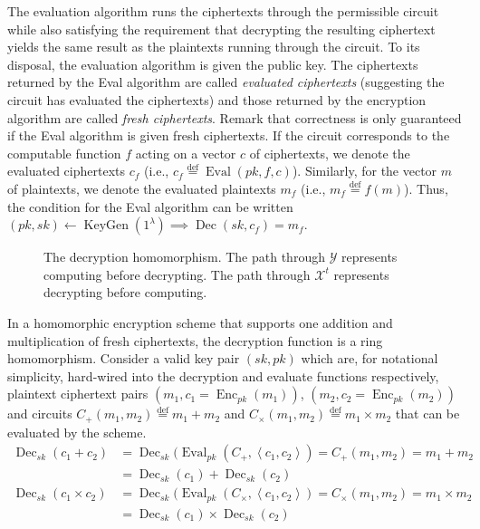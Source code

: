 The evaluation algorithm runs the ciphertexts through the permissible circuit while also satisfying the requirement that decrypting the resulting ciphertext yields the same result as the plaintexts running through the circuit. To its disposal, the evaluation algorithm is given the public key. The ciphertexts returned by the Eval algorithm are called \emph{evaluated ciphertexts} (suggesting the circuit has evaluated the ciphertexts) and those returned by the encryption algorithm are called \emph{fresh ciphertexts}. Remark that correctness is only guaranteed if the Eval algorithm is given fresh ciphertexts. If the circuit corresponds to the computable function $f$ acting on a vector $c$ of ciphertexts, we denote the evaluated ciphertexts $c_f$ (i.e., $c_f \stackrel{\mathrm{def}}{=} \operatorname{Eval}(pk, f, c)$). Similarly, for the vector $m$ of plaintexts, we denote the evaluated plaintexts $m_f$ (i.e., $m_f \stackrel{\mathrm{def}}{=} f(m)$). Thus, the condition for the Eval algorithm can be written $(pk,sk) \leftarrow \operatorname{KeyGen}(1^{\lambda}) \implies \operatorname{Dec}(sk, c_f) = m_f$.
\begin{figure}
    
    \caption{The decryption homomorphism. The path through $\mathcal{Y}$ represents computing before decrypting. The path through $\mathcal{X}^t$ represents decrypting before computing.}
    \label{fig:homomorphism}
\end{figure}
In a homomorphic encryption scheme that supports one addition and multiplication of fresh ciphertexts, the decryption function is a ring homomorphism. Consider a valid key pair $(sk,pk)$ which are, for notational simplicity, hard-wired into the decryption and evaluate functions respectively, plaintext ciphertext pairs $(m_1,c_1 = \operatorname{Enc}_{pk}(m_1))$, $(m_2, c_2 = \operatorname{Enc}_{pk}(m_2))$ and circuits $C_+(m_1,m_2) \stackrel{\mathrm{def}}{=} m_1 + m_2$ and $C_{\times}(m_1,m_2) \stackrel{\mathrm{def}}{=} m_1 \times m_2$ that can be evaluated by the scheme. 
\begin{equation*}
\begin{aligned}
\operatorname{Dec}_{sk}(c_1 + c_2) &= \operatorname{Dec}_{sk}(\operatorname{Eval}_{pk}(C_+,\left\langle c_1,c_2 \right \rangle) = C_+(m_1,m_2) = m_1 + m_2 \\
    & = \operatorname{Dec}_{sk}(c_1) + \operatorname{Dec}_{sk}(c_2)\\
\operatorname{Dec}_{sk}(c_1 \times c_2) &= \operatorname{Dec}_{sk}(\operatorname{Eval}_{pk}(C_{\times},\left\langle c_1,c_2 \right \rangle) = C_{\times}(m_1,m_2) = m_1 \times m_2 \\
    & = \operatorname{Dec}_{sk}(c_1) \times \operatorname{Dec}_{sk}(c_2)
\end{aligned}
\end{equation*}
